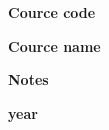 \pagestyle{empty}
\clearpage\begin{center}

\vfill
\vspace*{4cm}
\Huge{\bfseries Cource code}

\vspace{8mm}
\Huge{\bfseries Cource name}

\vspace{8mm}
\Huge{\bfseries Notes}

\vspace{8mm}
\Huge{\bfseries year}

\vfill
\end{center}
